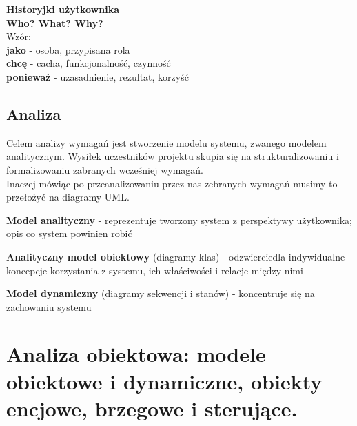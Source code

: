 \documentclass[12pt]{article}
\begin{document}
    
    \begin{definition}
    \textbf{Historyjki użytkownika} \\
    
    \textbf{Who? What? Why?} \\
    
    Wzór: \\
    
    \textbf{jako} - osoba, przypisana rola \\
    \textbf{chcę} - cacha, funkcjonalność, czynność \\
    \textbf{ponieważ} - uzasadnienie, rezultat, korzyść \\
    \end{definition}
    
    \subsection{Analiza}
    
    \begin{definition}
    Celem analizy wymagań jest stworzenie modelu systemu, zwanego modelem analitycznym. Wysiłek uczestników projektu skupia się na strukturalizowaniu i formalizowaniu zabranych wcześniej wymagań. \\
    Inaczej mówiąc po przeanalizowaniu przez nas zebranych wymagań musimy to przełożyć na diagramy UML.
    \end{definition}
    
    \begin{definition}
    \textbf{Model analityczny} - reprezentuje tworzony system z perspektywy użytkownika; opis co system powinien robić
    \end{definition}
    
    \begin{definition}
    \textbf{Analityczny model obiektowy} (diagramy klas) - odzwierciedla indywidualne koncepcje korzystania z systemu, ich właściwości i relacje między nimi
    \end{definition}
    
    \begin{definition}
    \textbf{Model dynamiczny} (diagramy sekwencji i stanów) - koncentruje się na zachowaniu systemu
    \end{definition}
    
   \newpage

    \section{Analiza obiektowa: modele obiektowe i dynamiczne, obiekty encjowe, brzegowe i sterujące.}
\end{document}
